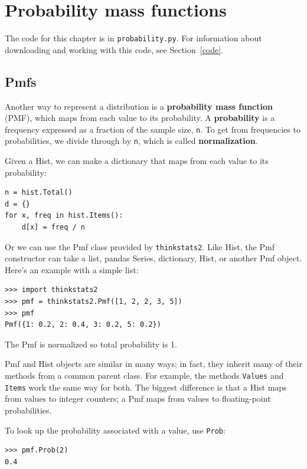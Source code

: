 \documentclass[12pt]{book}
\theoremstyle{exercise}
\begin{document}
\chapter{Probability mass functions}%

The code for this chapter is in {\tt probability.py}.
For information about downloading and
working with this code, see Section~\ref{code}.


\section{Pmfs}%

Another way to represent a distribution is a {\bf probability mass
  function} (PMF), which maps from each value to its probability.  A
{\bf probability} is a frequency expressed as a fraction of the sample
size, {\tt n}.  To get from frequencies to probabilities, we divide
through by {\tt n}, which is called {\bf normalization}.%
%
%
%
%

Given a Hist, we can make a dictionary that maps from each
value to its probability:%
%
\begin{verbatim}
n = hist.Total()
d = {}
for x, freq in hist.Items():
    d[x] = freq / n
\end{verbatim}
%
Or we can use the Pmf class provided by {\tt thinkstats2}.
Like Hist, the Pmf constructor can take a list, pandas
Series, dictionary, Hist, or another Pmf object.  Here's an example
with a simple list:
%
\begin{verbatim}
>>> import thinkstats2
>>> pmf = thinkstats2.Pmf([1, 2, 2, 3, 5])
>>> pmf
Pmf({1: 0.2, 2: 0.4, 3: 0.2, 5: 0.2})
\end{verbatim}

The Pmf is normalized so total probability is 1.

Pmf and Hist objects are similar in many ways; in fact, they inherit
many of their methods from a common parent class.  For example, the
methods {\tt Values} and {\tt Items} work the same way for both.  The
biggest difference is that a Hist maps from values to integer
counters; a Pmf maps from values to floating-point probabilities.%

To look up the probability associated with a value, use {\tt Prob}:
%
\begin{verbatim}
>>> pmf.Prob(2)
0.4
\end{verbatim}
\end{document}
